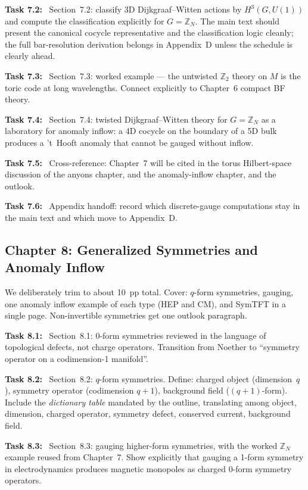 \documentclass[11pt]{article}
\newcommand{\task}[1]{\medskip\noindent\textbf{Task #1:}\ }
\begin{document}
\task{7.2} Section~7.2: classify 3D Dijkgraaf--Witten actions by $H^3(G,U(1))$ and
compute the classification explicitly for $G=\mathbb{Z}_N$. The main text should present
the canonical cocycle representative and the classification logic cleanly; the full bar-resolution
derivation belongs in Appendix~D unless the schedule is clearly ahead.

\task{7.3} Section~7.3: worked example --- the untwisted $\mathbb{Z}_2$ theory on $M$ is
the toric code at long wavelengths. Connect explicitly to Chapter~6 compact BF theory.

\task{7.4} Section~7.4: twisted Dijkgraaf--Witten theory for $G=\mathbb{Z}_N$ as a
laboratory for anomaly inflow: a 4D cocycle on the boundary of a 5D bulk produces
a 't~Hooft anomaly that cannot be gauged without inflow.

\task{7.5} Cross-reference: Chapter~7 will be cited in the torus Hilbert-space
discussion of the anyons chapter, and the anomaly-inflow chapter, and the outlook.

\task{7.6} Appendix handoff: record which discrete-gauge computations stay in the main
text and which move to Appendix~D.

\subsection{Chapter 8: Generalized Symmetries and Anomaly Inflow}

\begin{insight}
We deliberately trim to about 10~pp total. Cover: $q$-form symmetries, gauging, one anomaly
inflow example of each type (HEP and CM), and SymTFT in a single page. Non-invertible
symmetries get one outlook paragraph.
\end{insight}

\task{8.1} Section~8.1: 0-form symmetries reviewed in the language of topological
defects, not charge operators. Transition from Noether to ``symmetry operator on a
codimension-1 manifold''.

\task{8.2} Section~8.2: $q$-form symmetries. Define: charged object (dimension~$q$),
symmetry operator (codimension $q+1$), background field ($(q+1)$-form). Include the
\emph{dictionary table} mandated by the outline, translating among object, dimension,
charged operator, symmetry defect, conserved current, background field.

\task{8.3} Section~8.3: gauging higher-form symmetries, with the worked $\mathbb{Z}_N$
example reused from Chapter~7. Show explicitly that gauging a 1-form symmetry in
electrodynamics produces magnetic monopoles as charged 0-form symmetry operators.
\end{document}
